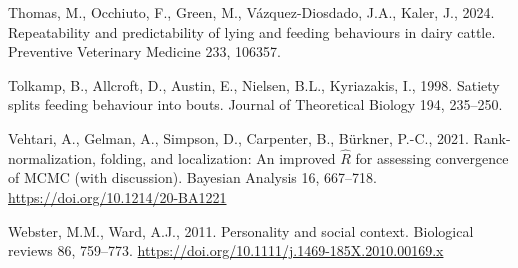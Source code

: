 \documentclass[
]{article}
\newlength{\cslhangindent}
\newenvironment{CSLReferences}[2] %
 {\begin{list}{}{%
  \setlength{\itemindent}{0pt}
  \setlength{\leftmargin}{0pt}
  \setlength{\parsep}{0pt}
  \ifodd #1
   \setlength{\leftmargin}{\cslhangindent}
   \setlength{\itemindent}{-1\cslhangindent}
  \fi
  \setlength{\itemsep}{#2\baselineskip}}}
 {\end{list}}
\begin{document}
\begin{CSLReferences}{1}{0}
Thomas, M., Occhiuto, F., Green, M., Vázquez-Diosdado, J.A., Kaler, J.,
2024. Repeatability and predictability of lying and feeding behaviours
in dairy cattle. Preventive Veterinary Medicine 233, 106357.

Tolkamp, B., Allcroft, D., Austin, E., Nielsen, B.L., Kyriazakis, I.,
1998. Satiety splits feeding behaviour into bouts. Journal of
Theoretical Biology 194, 235--250.

Vehtari, A., Gelman, A., Simpson, D., Carpenter, B., Bürkner, P.-C.,
2021. Rank-normalization, folding, and localization: An improved
\(\widehat{R}\) for assessing convergence of {MCMC} (with discussion).
Bayesian Analysis 16, 667--718. \url{https://doi.org/10.1214/20-BA1221}

Webster, M.M., Ward, A.J., 2011. Personality and social context.
Biological reviews 86, 759--773.
\url{https://doi.org/10.1111/j.1469-185X.2010.00169.x}

\end{CSLReferences}
\end{document}
